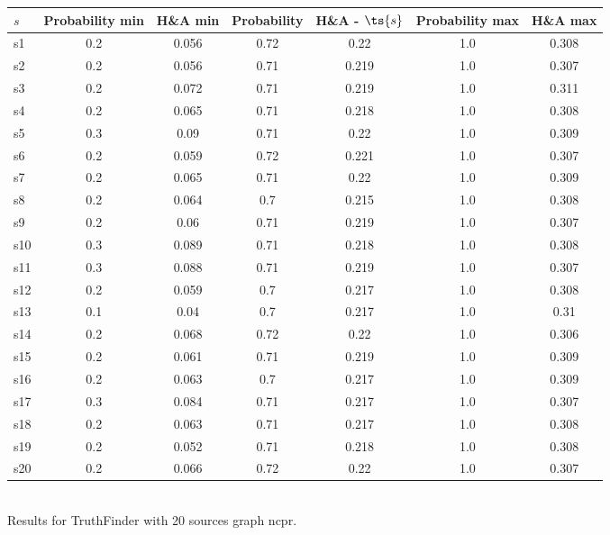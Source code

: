 \documentclass{article}
\begin{document}
\noindent\begin{tabular}{|l|c|c|c|c|c|c|}
\hline
$s$& Probability min & H\&A min & Probability & H\&A - $\ts{s}$ & Probability max & H\&A max\\
\hline
s1 &0.2 & 0.056 & 0.72 & 0.22 & 1.0 & 0.308\\
\hline
s2 &0.2 & 0.056 & 0.71 & 0.219 & 1.0 & 0.307\\
\hline
s3 &0.2 & 0.072 & 0.71 & 0.219 & 1.0 & 0.311\\
\hline
s4 &0.2 & 0.065 & 0.71 & 0.218 & 1.0 & 0.308\\
\hline
s5 &0.3 & 0.09 & 0.71 & 0.22 & 1.0 & 0.309\\
\hline
s6 &0.2 & 0.059 & 0.72 & 0.221 & 1.0 & 0.307\\
\hline
s7 &0.2 & 0.065 & 0.71 & 0.22 & 1.0 & 0.309\\
\hline
s8 &0.2 & 0.064 & 0.7 & 0.215 & 1.0 & 0.308\\
\hline
s9 &0.2 & 0.06 & 0.71 & 0.219 & 1.0 & 0.307\\
\hline
s10 &0.3 & 0.089 & 0.71 & 0.218 & 1.0 & 0.308\\
\hline
s11 &0.3 & 0.088 & 0.71 & 0.219 & 1.0 & 0.307\\
\hline
s12 &0.2 & 0.059 & 0.7 & 0.217 & 1.0 & 0.308\\
\hline
s13 &0.1 & 0.04 & 0.7 & 0.217 & 1.0 & 0.31\\
\hline
s14 &0.2 & 0.068 & 0.72 & 0.22 & 1.0 & 0.306\\
\hline
s15 &0.2 & 0.061 & 0.71 & 0.219 & 1.0 & 0.309\\
\hline
s16 &0.2 & 0.063 & 0.7 & 0.217 & 1.0 & 0.309\\
\hline
s17 &0.3 & 0.084 & 0.71 & 0.217 & 1.0 & 0.307\\
\hline
s18 &0.2 & 0.063 & 0.71 & 0.217 & 1.0 & 0.308\\
\hline
s19 &0.2 & 0.052 & 0.71 & 0.218 & 1.0 & 0.308\\
\hline
s20 &0.2 & 0.066 & 0.72 & 0.22 & 1.0 & 0.307\\
\hline
\end{tabular}\\

\noindent Results for TruthFinder with 20 sources graph ncpr.
\end{document}
